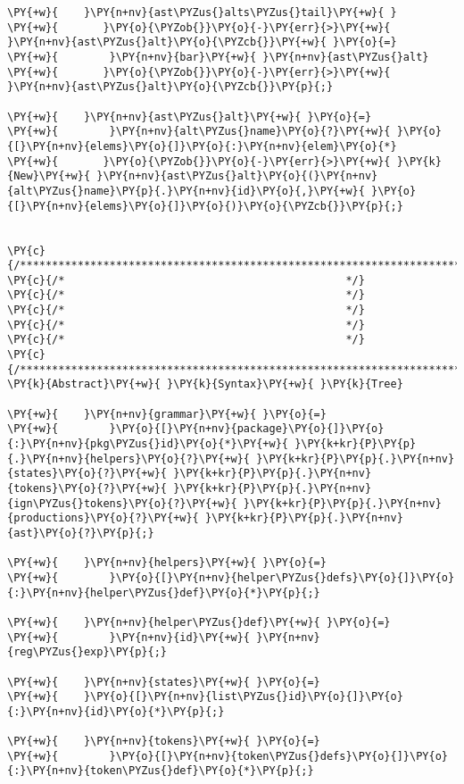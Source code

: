 \begin{Verbatim}[commandchars=\\\{\}]
\PY{+w}{    }\PY{n+nv}{ast\PYZus{}alts\PYZus{}tail}\PY{+w}{ }
\PY{+w}{	   }\PY{o}{\PYZob{}}\PY{o}{-}\PY{err}{>}\PY{+w}{ }\PY{n+nv}{ast\PYZus{}alt}\PY{o}{\PYZcb{}}\PY{+w}{ }\PY{o}{=}
\PY{+w}{        }\PY{n+nv}{bar}\PY{+w}{ }\PY{n+nv}{ast\PYZus{}alt}
\PY{+w}{	   }\PY{o}{\PYZob{}}\PY{o}{-}\PY{err}{>}\PY{+w}{ }\PY{n+nv}{ast\PYZus{}alt}\PY{o}{\PYZcb{}}\PY{p}{;}

\PY{+w}{    }\PY{n+nv}{ast\PYZus{}alt}\PY{+w}{ }\PY{o}{=}
\PY{+w}{        }\PY{n+nv}{alt\PYZus{}name}\PY{o}{?}\PY{+w}{ }\PY{o}{[}\PY{n+nv}{elems}\PY{o}{]}\PY{o}{:}\PY{n+nv}{elem}\PY{o}{*}
\PY{+w}{	   }\PY{o}{\PYZob{}}\PY{o}{-}\PY{err}{>}\PY{+w}{ }\PY{k}{New}\PY{+w}{ }\PY{n+nv}{ast\PYZus{}alt}\PY{o}{(}\PY{n+nv}{alt\PYZus{}name}\PY{p}{.}\PY{n+nv}{id}\PY{o}{,}\PY{+w}{ }\PY{o}{[}\PY{n+nv}{elems}\PY{o}{]}\PY{o}{)}\PY{o}{\PYZcb{}}\PY{p}{;}


\PY{c}{/*****************************************************************************************/}
\PY{c}{/*											 */}
\PY{c}{/*											 */}
\PY{c}{/*											 */}
\PY{c}{/*											 */}
\PY{c}{/*											 */}
\PY{c}{/*****************************************************************************************/}
\PY{k}{Abstract}\PY{+w}{ }\PY{k}{Syntax}\PY{+w}{ }\PY{k}{Tree}

\PY{+w}{    }\PY{n+nv}{grammar}\PY{+w}{ }\PY{o}{=}
\PY{+w}{        }\PY{o}{[}\PY{n+nv}{package}\PY{o}{]}\PY{o}{:}\PY{n+nv}{pkg\PYZus{}id}\PY{o}{*}\PY{+w}{ }\PY{k+kr}{P}\PY{p}{.}\PY{n+nv}{helpers}\PY{o}{?}\PY{+w}{ }\PY{k+kr}{P}\PY{p}{.}\PY{n+nv}{states}\PY{o}{?}\PY{+w}{ }\PY{k+kr}{P}\PY{p}{.}\PY{n+nv}{tokens}\PY{o}{?}\PY{+w}{ }\PY{k+kr}{P}\PY{p}{.}\PY{n+nv}{ign\PYZus{}tokens}\PY{o}{?}\PY{+w}{ }\PY{k+kr}{P}\PY{p}{.}\PY{n+nv}{productions}\PY{o}{?}\PY{+w}{ }\PY{k+kr}{P}\PY{p}{.}\PY{n+nv}{ast}\PY{o}{?}\PY{p}{;}

\PY{+w}{    }\PY{n+nv}{helpers}\PY{+w}{ }\PY{o}{=}
\PY{+w}{        }\PY{o}{[}\PY{n+nv}{helper\PYZus{}defs}\PY{o}{]}\PY{o}{:}\PY{n+nv}{helper\PYZus{}def}\PY{o}{*}\PY{p}{;}

\PY{+w}{    }\PY{n+nv}{helper\PYZus{}def}\PY{+w}{ }\PY{o}{=}
\PY{+w}{        }\PY{n+nv}{id}\PY{+w}{ }\PY{n+nv}{reg\PYZus{}exp}\PY{p}{;}

\PY{+w}{    }\PY{n+nv}{states}\PY{+w}{ }\PY{o}{=}
\PY{+w}{	}\PY{o}{[}\PY{n+nv}{list\PYZus{}id}\PY{o}{]}\PY{o}{:}\PY{n+nv}{id}\PY{o}{*}\PY{p}{;}

\PY{+w}{    }\PY{n+nv}{tokens}\PY{+w}{ }\PY{o}{=}
\PY{+w}{        }\PY{o}{[}\PY{n+nv}{token\PYZus{}defs}\PY{o}{]}\PY{o}{:}\PY{n+nv}{token\PYZus{}def}\PY{o}{*}\PY{p}{;}


\end{Verbatim}
